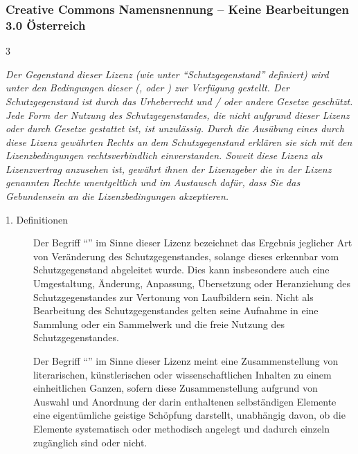 \begin{WidePar}
\scriptsize\subsubsection{Creative Commons Namensnennung --
Keine Bearbeitungen 3.0 Österreich}
\begin{multicols}{3}
\label{topic:lizenz}

{\FontSerifNarrowFamily\itshape\noindent Der Gegenstand dieser Lizenz (wie unter
\enquote{Schutzgegenstand} definiert) wird unter
den Bedingungen dieser 
(,  oder
) zur Verfügung gestellt. Der
Schutzgegenstand ist durch das Urheberrecht und / oder
andere Gesetze geschützt. Jede Form der Nutzung des
Schutzgegenstandes, die nicht aufgrund dieser Lizenz oder
durch Gesetze gestattet ist, ist unzulässig. Durch die
Ausübung eines durch diese Lizenz gewährten Rechts an dem
Schutzgegenstand erklären sie sich mit den Lizenzbedingungen
rechtsverbindlich einverstanden. Soweit diese Lizenz als
Lizenzvertrag anzusehen ist, gewährt ihnen der Lizenzgeber
die in der Lizenz genannten Rechte unentgeltlich und im
Austausch dafür, dass Sie das Gebundensein an die
Lizenzbedingungen akzeptieren.}


\begin{description}
  \item[{1. Definitionen}] Der Begriff
  \enquote{} im Sinne dieser Lizenz 
  bezeichnet das Ergebnis jeglicher Art von Veränderung
  des Schutzgegenstandes, solange dieses erkennbar vom
  Schutzgegenstand abgeleitet wurde. Dies kann
  insbesondere auch eine Umgestaltung, Änderung,
  Anpassung, Übersetzung oder Heranziehung des
  Schutzgegenstandes zur Vertonung von Laufbildern sein.
  Nicht als Bearbeitung des Schutzgegenstandes gelten
  seine Aufnahme in eine Sammlung oder ein Sammelwerk und
  die freie Nutzung des Schutzgegenstandes.
  
  Der Begriff \enquote{} im Sinne dieser
  Lizenz meint eine Zusammenstellung von literarischen,
  künstlerischen oder wissenschaftlichen Inhalten zu einem
  einheitlichen Ganzen, sofern diese Zusammenstellung
  aufgrund von Auswahl und Anordnung der darin enthaltenen
  selbständigen Elemente eine eigentümliche geistige
  Schöpfung darstellt, unabhängig davon, ob die Elemente
  systematisch oder methodisch angelegt und dadurch
  einzeln zugänglich sind oder nicht.
  

\end{description}
\end{multicols}
\end{WidePar}
